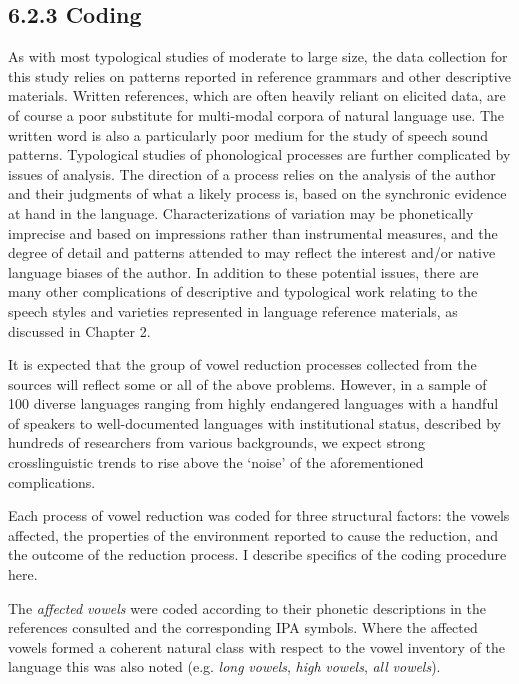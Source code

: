 \z

\subsection{6.2.3 Coding}

  As with most typological studies of moderate to large size, the data collection for this study relies on patterns reported in reference grammars and other descriptive materials. Written references, which are often heavily reliant on elicited data, are of course a poor substitute for multi-modal corpora of natural language use. The written word is also a particularly poor medium for the study of speech sound patterns. Typological studies of phonological processes are further complicated by issues of analysis. The direction of a process relies on the analysis of the author and their judgments of what a likely process is, based on the synchronic evidence at hand in the language. Characterizations of variation may be phonetically imprecise and based on impressions rather than instrumental measures, and the degree of detail and patterns attended to may reflect the interest and/or native language biases of the author. In addition to these potential issues, there are many other complications of descriptive and typological work relating to the speech styles and varieties represented in language reference materials, as discussed in Chapter 2.



  It is expected that the group of vowel reduction processes collected from the sources will reflect some or all of the above problems. However, in a sample of 100 diverse languages ranging from highly endangered languages with a handful of speakers to well-documented languages with institutional status, described by hundreds of researchers from various backgrounds, we expect strong crosslinguistic trends to rise above the ‘noise’ of the aforementioned complications.



  Each process of vowel reduction was coded for three structural factors: the vowels affected, the properties of the environment reported to cause the reduction, and the outcome of the reduction process. I describe specifics of the coding procedure here.



  The \textit{affected} \textit{vowels} were coded according to their phonetic descriptions in the references consulted and the corresponding IPA symbols. Where the affected vowels formed a coherent natural class with respect to the vowel inventory of the language this was also noted (e.g. \textit{long} \textit{vowels}, \textit{high} \textit{vowels}, \textit{all} \textit{vowels}).



